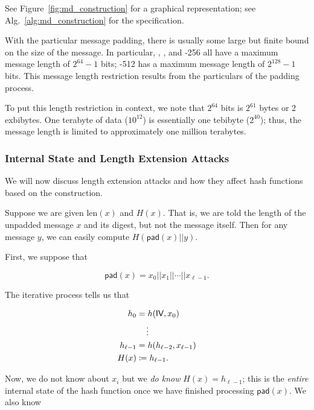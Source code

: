 \noindent
See Figure~\ref{fig:md_construction} for a graphical representation;
see Alg.~\ref{alg:md_construction} for the specification.




With the particular message padding, there is usually some large
but finite bound on the size of the message.
In particular, \MDFive{}, \ShaOne{}, and \ShaTwo{}-256 
all have a maximum message length of $2^{64}-1$ bits;
\ShaTwo{}-512 has a maximum message length of $2^{128}-1$ bits.
This message length restriction results from the particulars
of the padding process.

To put this length restriction in context,
we note that $2^{64}$ bits is $2^{61}$ bytes or 2 exbibytes.
One terabyte of data ($10^{12}$) is essentially one tebibyte ($2^{40}$);
thus, the message length is limited to approximately
one million terabytes.

\subsubsection{Internal State and Length Extension Attacks}

We will now discuss length extension attacks and how they affect
\glspl{hash function} based on the \MD{} construction.

Suppose we are given $\text{len}(x)$ and $H(x)$.
That is, we are told the length of the unpadded message $x$ and its digest,
but not the message itself.
Then for any message $y$, we can easily compute $H(\textsf{pad}(x)||y)$.

First, we suppose that

\begin{equation}
    \textsf{pad}(x) = x_{0}||x_{1}||\cdots||x_{\ell-1}.
\end{equation}

\noindent
The iterative process tells us that

\begin{align}
    h_{0} &= h(\textsf{IV}, x_{0}) \nonumber\\
        &\quad \vdots \nonumber\\
    h_{\ell-1} &= h(h_{\ell-2}, x_{\ell-1}) \nonumber\\
    H(x) &\coloneqq{} h_{\ell-1}.
\end{align}

\noindent
Now, we do not know about $x_{i}$ but we \emph{do know} $H(x) = h_{\ell-1}$;
this is the \emph{entire} internal state of the \gls{hash function} once we
have finished processing $\textsf{pad}(x)$.
We also know

